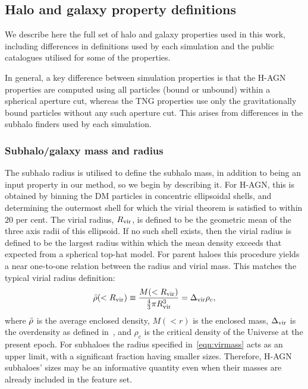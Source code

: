 \documentclass[useAMS,usenatbib]{mnras}
\begin{document}
\subsection{Halo and galaxy property definitions}\label{sec:halo_galaxy_defs}

We describe here the full set of halo and galaxy properties used in this work, including differences in definitions used by each simulation and the public catalogues utilised for some of the properties.

In general, a key difference between simulation properties is that the H-AGN properties are computed using all particles (bound or unbound) within a spherical aperture cut, whereas the TNG properties use only the gravitationally bound particles without any such aperture cut. This arises from differences in the subhalo finders used by each simulation.

\subsubsection{Subhalo/galaxy mass and radius}\label{sec:Mass_Radius}

The subhalo radius is utilised to define the subhalo mass, in addition to being an input property in our method, so we begin by describing it. For H-AGN, this is obtained by binning the DM particles in concentric ellipsoidal shells, and determining the outermost shell for which the virial theorem is satisfied to within $20$ per cent. The virial radius, $R_{\rm vir}$, is defined to be the geometric mean of the three axis radii of this ellipsoid. If no such shell exists, then the virial radius is defined to be the largest radius within which the mean density exceeds that expected from a spherical top-hat model. For parent haloes this procedure yields a near one-to-one relation between the radius and virial mass. This matches the typical virial radius definition:
\begin{equation}\label{eqn:virmass}
    \Bar{\rho}(<R_{\rm vir}) \equiv \frac{M(<R_{\rm vir})}{\frac{4}{3}\pi R_{\rm vir}^3} = \Delta_{\rm vir}\rho_c,
\end{equation}
where $\Bar{\rho}$ is the average enclosed density, $M(<r)$ is the enclosed mass, $\Delta_{\rm vir}$ is the overdensity as defined in~\citet{BryanNorman1998}, and $\rho_c$ is the critical density of the Universe at the present epoch. For subhaloes the radius specified in~\cref{eqn:virmass} acts as an upper limit, with a significant fraction having smaller sizes. Therefore, H-AGN subhaloes' sizes may be an informative quantity even when their masses are already included in the feature set.
\end{document}
